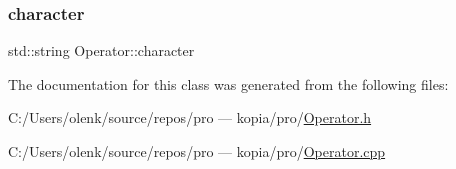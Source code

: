 \subsubsection{\texorpdfstring{character}{character}}
{\footnotesize\ttfamily std\+::string Operator\+::character\hspace{0.3cm}{\ttfamily [protected]}}



The documentation for this class was generated from the following files\+:\begin{DoxyCompactItemize}
\item 
C\+:/\+Users/olenk/source/repos/pro — kopia/pro/\mbox{\hyperlink{_operator_8h}{Operator.\+h}}\item 
C\+:/\+Users/olenk/source/repos/pro — kopia/pro/\mbox{\hyperlink{_operator_8cpp}{Operator.\+cpp}}\end{DoxyCompactItemize}
